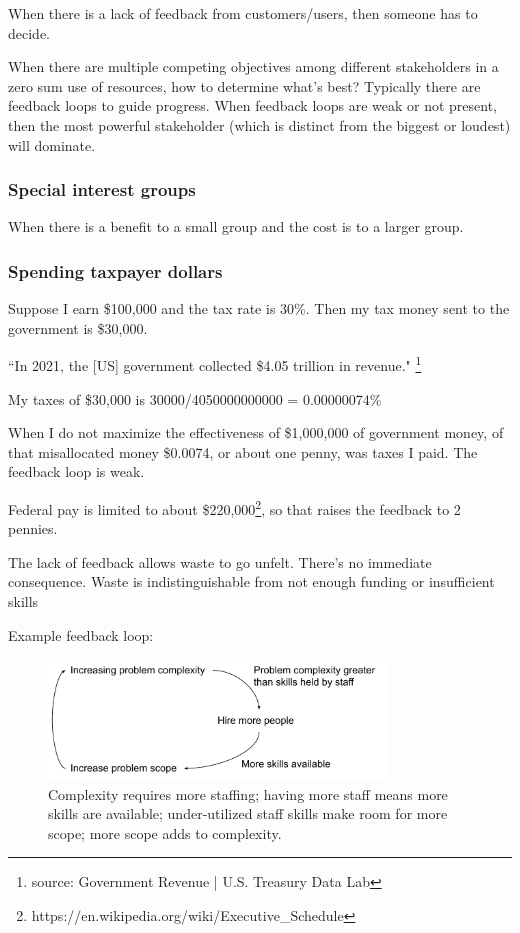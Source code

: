 
When there is a lack of feedback from customers/users, then someone has to decide.


When there are multiple competing objectives among different stakeholders in a zero sum use of resources, how to determine what's best? Typically there are feedback loops to guide progress. When feedback loops are weak or not present, then the most powerful stakeholder (which is distinct from the biggest or loudest) will dominate. 

\subsubsection{Special interest groups}

When there is a benefit to a small group and the cost is to a larger group.

\subsubsection{Spending taxpayer dollars}

Suppose I earn \$100,000 and the tax rate is 30\%. Then my tax money sent to the government is \$30,000.

``In 2021, the [US] government collected \$4.05 trillion in revenue."
\footnote{source: Government Revenue | U.S. Treasury Data Lab}

My taxes of \$30,000 is
30000/4050000000000 = 0.00000074\%

When I do not maximize the effectiveness of \$1,000,000 of government money, of that misallocated money \$0.0074, or about one penny, was taxes I paid. The feedback loop is weak.

Federal pay is limited to about \$220,000\footnote{https://en.wikipedia.org/wiki/Executive\_Schedule}, so that raises the feedback to 2 pennies.

The lack of feedback allows waste to go unfelt. There's no immediate consequence.
Waste is indistinguishable from not enough funding or insufficient skills 




Example feedback loop:
\begin{center}
\begin{figure}[ht]
    \centering
    \includegraphics[width=0.8\textwidth]{images/feedback_loop_complexity_and_staffing}
    \caption{Complexity requires more staffing; having more staff means more skills are available; under-utilized staff skills make room for more scope; more scope adds to complexity.}
    \label{fig:complexity_and_staff_growth}
\end{figure}
\end{center}


